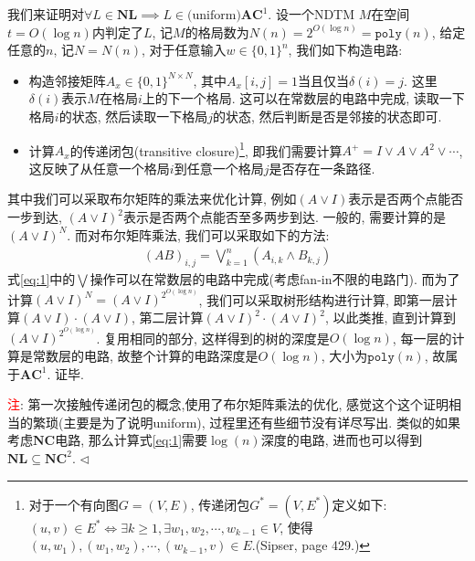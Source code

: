 \documentclass[11pt]{article}
\newcommand{\NL}{ \mathbf{NL}}
\newcommand{\NC}{\mathbf{NC}}
\newcommand{\AC}{\mathbf{AC}}
\newcommand{\1}{\mathbf{1}}
\newenvironment{answer}[1][Solution]{\begin{trivlist}
\item[\hskip \labelsep{\bfseries#1.}\hskip \labelsep]}{\hfill$\lhd$\end{trivlist}}
\begin{document}
\begin{answer}
    我们来证明对$\forall L \in \NL \implies L \in \text{(uniform)}\AC^1$. 设一个NDTM $M$在空间$t = O(\log n)$内判定了$L$, 记$M$的格局数为$N(n) = 2^{O(\log n)} = \texttt{poly}(n)$, 给定任意的$n$, 记$N = N(n)$, 对于任意输入$w \in \{0,1\}^n$, 我们如下构造电路:
    \begin{itemize}
        \item 构造邻接矩阵$A_x \in \{0,1\}^{N\times N}$, 其中$A_x[i,j] = 1$当且仅当$\delta(i) = j$. 这里$\delta(i)$表示$M$在格局$i$上的下一个格局. 这可以在常数层的电路中完成, 读取一下格局$i$的状态, 然后读取一下格局$j$的状态, 然后判断是否是邻接的状态即可.
        \item 计算$A_x$的传递闭包(transitive closure)\footnote{对于一个有向图$G = (V,E)$, 传递闭包$G^* = (V,E^*)$定义如下: $(u,v) \in E^* \iff \exists k\ge 1, \exists w_1, w_2, \cdots, w_{k-1} \in V$, 使得$(u,w_1), (w_1, w_2), \cdots, (w_{k-1}, v) \in E$.(Sipser, page 429.) }, 即我们需要计算$A^+ = I \lor A \lor A^2 \lor \cdots$, 这反映了从任意一个格局$i$到任意一个格局$j$是否存在一条路径. 
    \end{itemize} 
    其中我们可以采取布尔矩阵的乘法来优化计算, 例如$(A \lor I)$表示是否两个点能否一步到达, $(A\lor I)^2$表示是否两个点能否至多两步到达. 一般的, 需要计算的是$(A \lor I)^N$. 而对布尔矩阵乘法, 我们可以采取如下的方法:
    \begin{align}
        \label{eq:1}
        (AB)_{i,j} = \bigvee_{k=1}^n (A_{i,k} \land B_{k,j}) 
    \end{align} 
    式\eqref{eq:1}中的$\bigvee$操作可以在常数层的电路中完成(考虑fan-in不限的电路门). 而为了计算$(A \lor I)^N = (A \lor I)^{2^{O(\log n)}}$, 我们可以采取树形结构进行计算, 即第一层计算$(A\lor I) \cdot (A\lor I)$, 第二层计算$(A\lor I)^2 \cdot (A\lor I)^2$, 以此类推, 直到计算到$(A\lor I)^{2^{O(\log n)}}$. 复用相同的部分, 这样得到的树的深度是$O(\log n)$, 每一层的计算是常数层的电路, 故整个计算的电路深度是$O(\log n)$, 大小为$\texttt{poly}(n)$, 故属于$\AC^1$. 证毕.

    \textcolor{red}{注}: 第一次接触传递闭包的概念,使用了布尔矩阵乘法的优化, 感觉这个这个证明相当的繁琐(主要是为了说明uniform), 过程里还有些细节没有详尽写出. 类似的如果考虑$\NC$电路, 那么计算式\eqref{eq:1}需要$\log(n)$深度的电路, 进而也可以得到$\NL \subseteq \NC^2$.  
\end{answer}
\end{document}
